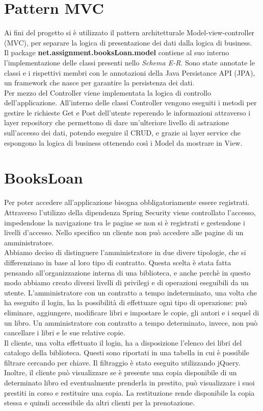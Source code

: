 \documentclass[a4paper,10pt]{article}
\begin{document}
\section*{Pattern MVC}
Ai fini del progetto si è utilizzato il pattern architetturale Model-view-controller (MVC), per separare la logica di presentazione dei dati dalla logica di business.\\

\sloppy\noindent Il package \textbf{net.assignment.booksLoan.model} contiene al suo interno l'implementazione delle classi presenti nello \textit{Schema E-R}. Sono state annotate le classi e i rispettivi membri con le annotazioni della Java Persistance API (JPA), un framework che nasce per garantire la persistenza dei dati.\\

\noindent Per mezzo del Controller viene implementata la logica di controllo dell'applicazione. All'interno delle classi Controller vengono eseguiti i metodi per gestire le richieste Get e Post dell'utente reperendo le informazioni attraverso i layer repository che permettono di dare un'ulteriore livello di astrazione sull'accesso dei dati, potendo eseguire il CRUD, e grazie ai layer service che espongono la logica di business ottenendo così i Model da mostrare in View.

\section*{BooksLoan}
Per poter accedere all’applicazione bisogna obbligatoriamente essere registrati. Attraverso l'utilizzo della dipendenza Spring Security viene controllato l'accesso, impedendone la navigazione tra le pagine se non si è registrati e gestendone i livelli d'accesso. Nello specifico un cliente non può accedere alle pagine di un amministratore.\\

\noindent Abbiamo deciso di distinguere l'amministratore in due divere tipologie, che si differenziano in base al loro tipo di contratto. Questa scelta è stata fatta pensando all'organizzazione interna di una biblioteca, e anche perchè in questo modo abbiamo creato diversi livelli di privilegi e di operazioni eseguibili da un utente. 
L'amministratore con un contratto a tempo indeterminato, una volta che ha eseguito il login, ha la possibilità di effettuare ogni tipo di operazione: può eliminare, aggiungere, modificare libri e impostare le copie, gli autori e i sequel di un libro.
Un amministratore con contratto a tempo determinato, invece, non può cancellare i libri e le sue relative copie.\\

\noindent Il cliente, una volta effettuato il login, ha a disposizione l'elenco dei libri del catalogo della biblioteca. Questi sono riportati in una tabella in cui è possibile filtrare cercando per chiave. Il filtraggio è stato eseguito utilizzando jQuery. Inoltre, il cliente può visualizzare se è presente una copia disponibile di un determinato libro ed eventualmente prenderla in prestito, può visualizzare i suoi prestiti in corso e restituire una copia. La restituzione rende disponibile la copia stessa e quindi accessibile da altri clienti per la prenotazione.\\
\end{document}
